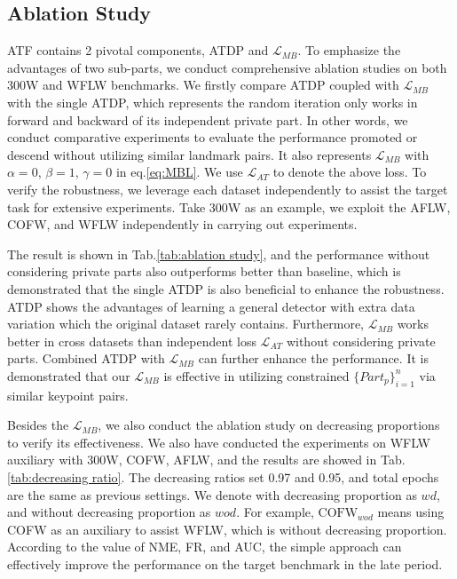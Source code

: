 \documentclass[journal,transmag]{IEEEtran}
\begin{document}
\subsection{Ablation Study}
ATF contains 2 pivotal components, ATDP and $\mathcal{L}_{MB}$.
To emphasize the advantages of two sub-parts, we conduct comprehensive ablation studies on both 300W\cite{300W} and WFLW\cite{LABWFLW} benchmarks.
We firstly compare ATDP coupled with $\mathcal{L}_{MB}$ with the single ATDP, which represents the random iteration only works in forward and backward of its independent private part.
In other words, we conduct comparative experiments to evaluate the performance promoted or descend without utilizing similar landmark pairs.
It also represents $\mathcal{L}_{MB}$ with $\alpha = 0$, $\beta =1 $, $\gamma=0$ in eq.\ref{eq:MBL}.
We use $\mathcal{L}_{AT}$ to denote the above loss.
To verify the robustness, we leverage each dataset independently to assist the target task for extensive experiments.
Take 300W as an example, we exploit the AFLW, COFW, and WFLW independently in carrying out experiments.

The result is shown in Tab.\ref{tab:ablation study}, and the performance without considering private parts also outperforms better than baseline, 
which is demonstrated that the single ATDP is also beneficial to enhance the robustness.
ATDP shows the advantages of learning a general detector with extra data variation which the original dataset rarely contains.
Furthermore, $\mathcal{L}_{MB}$ works better in cross datasets than independent loss $\mathcal{L}_{AT}$ without considering private parts.
Combined ATDP with $\mathcal{L}_{MB}$ can further enhance the performance.
It is demonstrated that our $\mathcal{L}_{MB}$ is effective in utilizing constrained $\{Part_p\}_{i=1}^n$ via similar keypoint pairs.

Besides the $\mathcal{L}_{MB}$, we also conduct the ablation study on decreasing proportions to verify its effectiveness.
We also have conducted the experiments on WFLW auxiliary with 300W, COFW, AFLW, and the results are showed in Tab.\ref{tab:decreasing ratio}.
The decreasing ratios set 0.97 and 0.95, and total epochs are the same as previous settings.
We denote with decreasing proportion as $wd$, and without decreasing proportion as $wod$.
For example, $\text{COFW}_{wod}$ means using COFW as an auxiliary to assist WFLW, which is without decreasing proportion.
According to the value of NME, FR, and AUC, the simple approach can effectively improve the performance on the target benchmark in the late period.
\end{document}
